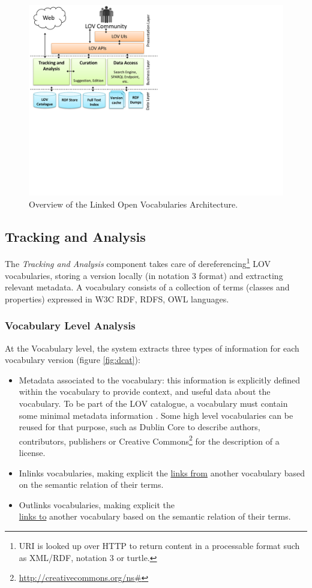 \documentclass{iosart2c}
\begin{document}
\begin{figure}[ht!b]
\includegraphics[trim={0cm 8cm 0cm 0cm},scale=.6]{lov_architecture.pdf}
\caption{Overview of the Linked Open Vocabularies Architecture.}
\label{fig:arch}
\end{figure}

\subsection{Tracking and Analysis}
	The \emph{Tracking and Analysis} component takes care of dereferencing\footnote{URI is looked up over HTTP to return content in a processable format such as XML/RDF, notation 3 or turtle.} LOV vocabularies, storing a version locally (in notation 3 format) and extracting relevant metadata. A vocabulary consists of a collection of terms (classes and properties) expressed in W3C RDF, RDFS, OWL languages. 

\subsubsection{Vocabulary Level Analysis}
At the Vocabulary level, the system extracts three types of information for each vocabulary version (figure \ref{fig:dcat}):
\begin{itemize}
\item Metadata associated to the vocabulary: this information is explicitly defined within the vocabulary to provide context, and useful data about the vocabulary. To be part of the LOV catalogue, a vocabulary must contain some minimal metadata information \cite{vandenbussche2011metadata}. Some high level vocabularies can be reused for that purpose, such as Dublin Core to describe authors, contributors, publishers or Creative Commons\footnote{\url{http://creativecommons.org/ns#}} for the description of a license.

\item Inlinks vocabularies, making explicit the \underline{links from} another vocabulary based on the semantic relation of their terms.

\item Outlinks vocabularies, making explicit the\\ \underline{links to} another vocabulary based on the semantic relation of their terms.
\end{itemize}
\end{document}
